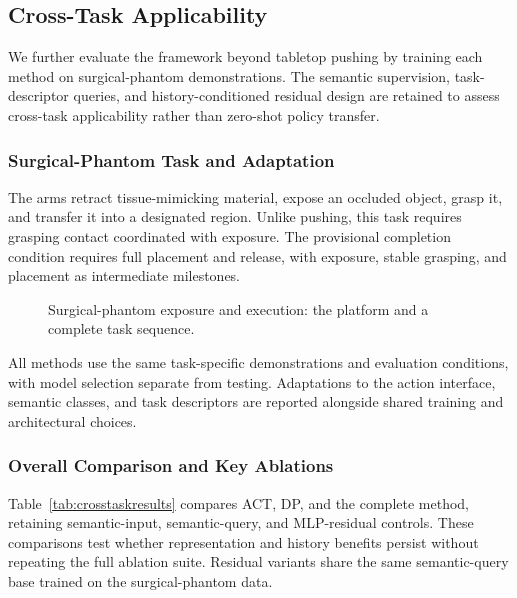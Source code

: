 \subsection{Cross-Task Applicability}
\label{sec:crosstask}
We further evaluate the framework beyond tabletop pushing by training each method on surgical-phantom demonstrations.
The semantic supervision, task-descriptor queries, and history-conditioned residual design are retained to assess cross-task applicability rather than zero-shot policy transfer.

\subsubsection{Surgical-Phantom Task and Adaptation}
The arms retract tissue-mimicking material, expose an occluded object, grasp it, and transfer it into a designated region.
Unlike pushing, this task requires grasping contact coordinated with exposure.
The provisional completion condition requires full placement and release, with exposure, stable grasping, and placement as intermediate milestones.

\begin{figure}[!tb]
\centering
\caption{Surgical-phantom exposure and execution: the platform and a complete task sequence.}
\label{fig:surgicaltask}
\end{figure}
All methods use the same task-specific demonstrations and evaluation conditions, with model selection separate from testing.
Adaptations to the action interface, semantic classes, and task descriptors are reported alongside shared training and architectural choices.

\subsubsection{Overall Comparison and Key Ablations}
Table~\ref{tab:crosstaskresults} compares ACT, DP, and the complete method, retaining semantic-input, semantic-query, and MLP-residual controls.
These comparisons test whether representation and history benefits persist without repeating the full ablation suite.
Residual variants share the same semantic-query base trained on the surgical-phantom data.

